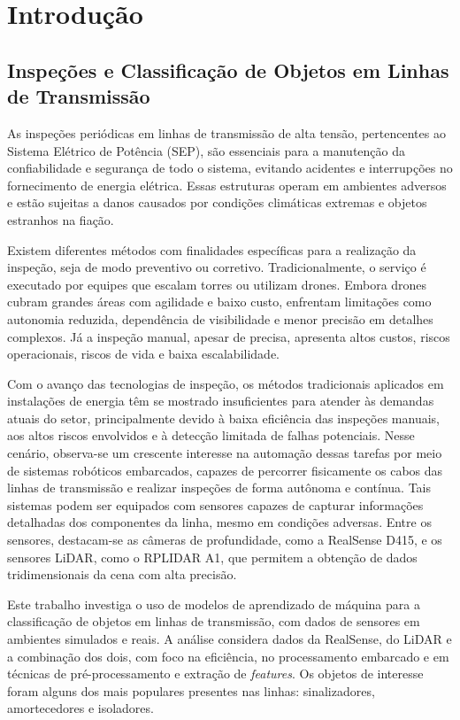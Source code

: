 
\chapter{Introdução}
\label{cap:trabalhos:introducao}

\section{Inspeções e Classificação de Objetos em Linhas de Transmissão}

As inspeções periódicas em linhas de transmissão de alta tensão, pertencentes ao Sistema Elétrico de Potência (SEP), são essenciais para a manutenção da confiabilidade e segurança de todo o sistema, evitando acidentes e interrupções no fornecimento de energia elétrica. Essas estruturas operam em ambientes adversos e estão sujeitas a danos causados por condições climáticas extremas e objetos estranhos na fiação. \par
Existem diferentes métodos com finalidades específicas para a realização da inspeção, seja de modo preventivo ou corretivo. Tradicionalmente, o serviço é executado por equipes que escalam torres ou utilizam drones. Embora drones cubram grandes áreas com agilidade e baixo custo, enfrentam limitações como autonomia reduzida, dependência de visibilidade e menor precisão em detalhes complexos. Já a inspeção manual, apesar de precisa, apresenta altos custos, riscos operacionais, riscos de vida e baixa escalabilidade. \par
Com o avanço das tecnologias de inspeção, os métodos tradicionais aplicados em instalações de energia têm se mostrado insuficientes para atender às demandas atuais do setor, principalmente devido à baixa eficiência das inspeções manuais, aos altos riscos envolvidos e à detecção limitada de falhas potenciais. Nesse cenário, observa-se um crescente interesse na automação dessas tarefas por meio de sistemas robóticos embarcados, capazes de percorrer fisicamente os cabos das linhas de transmissão e realizar inspeções de forma autônoma e contínua. Tais sistemas podem ser equipados com sensores capazes de capturar informações detalhadas dos componentes da linha, mesmo em condições adversas. Entre os sensores, destacam-se as câmeras de profundidade, como a RealSense D415, e os sensores LiDAR, como o RPLIDAR A1, que permitem a obtenção de dados tridimensionais da cena com alta precisão. \par
Este trabalho investiga o uso de modelos de aprendizado de máquina para a classificação de objetos em linhas de transmissão, com dados de sensores em ambientes simulados e reais. A análise considera dados da RealSense, do LiDAR e a combinação dos dois, com foco na eficiência, no processamento embarcado e em técnicas de pré-processamento e extração de \textit{features}. Os objetos de interesse foram alguns dos mais populares presentes nas linhas: sinalizadores, amortecedores e isoladores.

